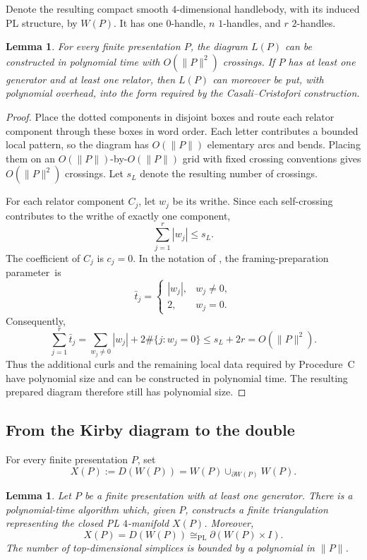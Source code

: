 \documentclass[a4paper,11pt,reqno]{amsart}
\newtheorem{lemma}[theorem]{Lemma}
\theoremstyle{definition}
\theoremstyle{remark}
\newcommand{\PL}{\mathrm{PL}}
\begin{document}
	Denote the resulting compact smooth $4$-dimensional handlebody,
	with its induced PL structure, by $W(P)$. It has one $0$-handle,
	$n$ $1$-handles, and $r$ $2$-handles.
	
	\begin{lemma}
		For every finite presentation $P$, the diagram $L(P)$
		can be constructed in polynomial time with $O(\|P\|^2)$ crossings.
		If $P$ has at least one generator and at least one relator, then
		$L(P)$ can moreover be put, with polynomial overhead, into
		the form required by the Casali--Cristofori construction.
	\end{lemma}
	
	\begin{proof}
		Place the dotted components in disjoint boxes and route each relator
		component through these boxes in word order. Each letter contributes a
		bounded local pattern, so the diagram has $O(\|P\|)$ elementary arcs
		and bends. Placing them on an $O(\|P\|)$-by-$O(\|P\|)$ grid with fixed
		crossing conventions gives $O(\|P\|^2)$ crossings. Let
		$s_{L}$ denote the resulting number of crossings.
		
		For each relator component $C_j$, let $w_j$ be its writhe. Since
		each self-crossing contributes to the writhe of exactly one component,
		\[
		\sum_{j=1}^{r}|w_j|\le s_{L}.
		\]
		The coefficient of $C_j$ is $c_j=0$. In the notation of
		\cite[Theorem~12]{CasaliCristofori}, the framing-preparation parameter~is
		\[
		\bar t_j=
		\begin{cases}
			|w_j|,&w_j\ne0,\\
			2,&w_j=0.
		\end{cases}
		\]
		Consequently,
		\[
		\sum_{j=1}^{r}\bar t_j
		=
		\sum_{w_j\ne0}|w_j|
		+2\#\{j:w_j=0\}
		\le s_{L}+2r
		=O(\|P\|^2).
		\]
		Thus the additional curls and the remaining local data required by
		Procedure~C have polynomial size and can be constructed in polynomial
		time. The resulting prepared diagram therefore still has polynomial
		size.
	\end{proof}
	
	\subsection{From the Kirby diagram to the double}
	
	For every finite presentation $P$, set
	\[
	X(P):=D(W(P))
	=W(P)\cup_{\partial W(P)}W(P).
	\]
	
	\begin{lemma}
		\label{lem:kirby-output}
		Let $P$ be a finite presentation with at least one generator.
		There is a polynomial-time algorithm which, given $P$, constructs a
		finite triangulation representing the closed PL $4$-manifold $X(P)$.
		Moreover,
		\[
		X(P)=D(W(P))
		\cong_{\PL}\partial(W(P)\times I).
		\]
		The number of top-dimensional simplices is bounded by a polynomial
		in $\|P\|$.
	\end{lemma}
	
\end{document}
